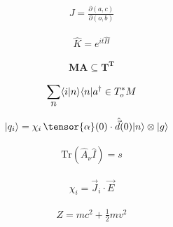 \documentclass[twocolumn,pra,aps,superscriptaddress]{revtex4-1}
\newcommand{\bra}[1]{\langle{#1}|}
\newcommand{\ket}[1]{|{#1}\rangle}
\newcommand{\braket}[2]{\langle{#1}|{#2}\rangle}
\begin{document}
\begin{align}
J = \frac{\partial (a, c)}{\partial (o, b)}
\end{align}

\begin{align}
\hat{K} = e^{i t \hat{H}}
\end{align}

\begin{align}
\mathbf{MA} \subseteq \mathbf{T}^{\mathbf{T}}
\end{align}

\begin{align}
\sum_{\mathlarger{n}} \braket{i}{n}\bra{n} a^{\dagger} \in T^*_o M
\end{align}

\begin{align} %
\ket{q_i} &= \chi_i \, \tensor{\alpha}(0) \cdot \hat{\vec{d}}(0) \ket{n} \otimes \ket{g}
\end{align}

\begin{align} %
\mathrm{Tr}\left(\hat{A}_\nu \hat{I} \right) = s
\end{align}

\begin{align} %
\chi_i = \vec{J}_{i} \cdot \vec{E}
\end{align}

\begin{align} %
Z = m c^2 + \frac{1}{2} m v^2
\end{align}
\end{document}
